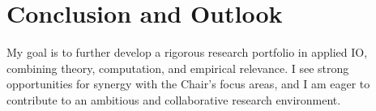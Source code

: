 \documentclass[11pt,a4paper]{article}
\begin{document}
\section*{Conclusion and Outlook}
My goal is to further develop a rigorous research portfolio in applied IO, combining theory, computation, and empirical relevance. I see strong opportunities for synergy with the Chair's focus areas, and I am eager to contribute to an ambitious and collaborative research environment.


\printbibliography
\end{document}
